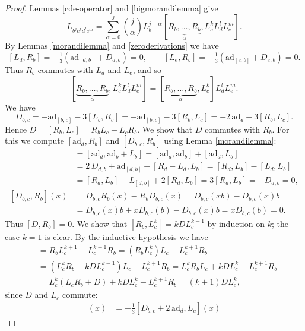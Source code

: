 \documentclass{amsart}
\theoremstyle{plain}
\theoremstyle{definition}
\begin{document}
\begin{proof}
Lemmas \ref{cde-operator} and \ref{bigmorandilemma} give
  \[
  L_{ b^j c^k d^l e^m }
  =
  \sum^j_{\alpha=0}
  \binom{j}{\alpha}
  L^{j-\alpha}_b
  [
  \underbrace{R_b,\dots,R_b}_\alpha,
  L^k_c L^l_d L^m_e
  ].
  \]
By Lemmas \ref{morandilemma} and \ref{zeroderivations} we have
  \[
  [L_d, R_b] = -\tfrac13(\mathrm{ad}_{[d,b]} + D_{d,b}) = 0,
  \qquad
  [L_e, R_b] = -\tfrac13(\mathrm{ad}_{[e,b]} + D_{e,b}) = 0.
  \]
Thus $R_b$ commutes with $L_d$ and $L_e$, and so
  \[
  [ \underbrace{R_b,\dots,R_b}_\alpha, L^k_c L^l_d L^m_e ]
  =
  [ \underbrace{R_b,\dots,R_b}_\alpha, L^k_c] L^l_d L^m_e.
  \]
We have
  \[
  D_{b,c}
  =
  -\mathrm{ad}_{[b,c]} - 3[L_b, R_c]
  =
  -\mathrm{ad}_{[b,c]} - 3[R_b, L_c]
  =
  -2 \, \mathrm{ad}_d - 3 [R_b, L_c].
  \]
Hence $D = [ R_b, L_c ] = R_b L_c - L_c R_b$. We show that $D$ commutes with
$R_b$. For this we compute $[\mathrm{ad}_d, R_b]$ and $[D_{b,c}, R_b]$ using
Lemma \ref{morandilemma}:
  \allowdisplaybreaks
  \begin{align*}
  [ \mathrm{ad}_d, R_b ]
  &=
  [ \mathrm{ad}_d, \mathrm{ad}_b {+} L_b ]
  =
  [ \mathrm{ad}_d, \mathrm{ad}_b ] + [ \mathrm{ad}_d, L_b ]
  \\
  &=
  2 \, D_{d,b} + \mathrm{ad}_{[d,b]} + [R_d {-} L_d, L_b]
  =
  [R_d, L_b] - [L_d, L_b]
  \\
  &=
  [R_d, L_b] - L_{[d,b]} + 2 [R_d, L_b]
  =
  3 [R_d, L_b]= - D_{d,b} = 0,
  \\
  [ D_{b,c}, R_b ] (x)
  &=
  D_{b,c} R_b (x) - R_b D_{b,c} (x)
  =
  D_{b,c}(xb) - D_{b,c}(x)b
  \\
  &=
  D_{b,c}(x) b + x D_{b,c}(b) - D_{b,c}(x) b
  =
  x D_{b,c}(b) = 0.
  \end{align*}
Thus $[D, R_b]=0$. We show that $[ R_b, L^k_c ] = k D L^{k-1}_c$ by induction
on $k$; the case $k = 1$ is clear. By the inductive hypothesis we have
  \allowdisplaybreaks
  \begin{align*}
  [R_b, L^{k+1}_c]
  &=
  R_b L^{k+1}_c - L^{k+1}_c R_b
  =
  ( R_b L^k_c ) L_c - L^{k+1}_c R_b
  \\
  &=
  (L^k_c R_b + k D L^{k-1}_c) L_c - L^{k+1}_c R_b
  =
  L^k_c R_b L_c + k D L^k_c - L^{k+1}_c R_b
  \\
  &=
  L^k_c (L_c R_b + D) + k D L^k_c - L^{k+1}_c R_b
  =
  (k{+}1) D L^k_c,
  \end{align*}
since $D$ and $L_c$ commute:
  \allowdisplaybreaks
  \begin{align*}
  [ D, L_c ] (x)
  &=
  - \tfrac13 [ D_{b,c} + 2 \, \mathrm{ad}_d, L_c ] (x)

\end{align*}
\end{proof}
\end{document}
